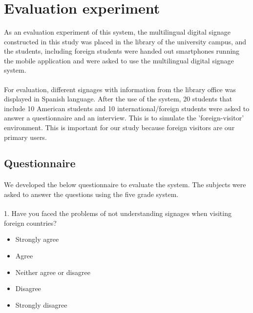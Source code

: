 \documentclass[12pt]{article}
\begin{document}
\section{Evaluation experiment}
\label{evaluation}

\paragraph{}As an evaluation experiment of this system, the multilingual digital signage constructed in this study was placed in the library of the university campus, and the students, including foreign students were handed out smartphones running the mobile application and were asked to use the multilingual digital signage system.

\paragraph{}For evaluation, different signages with information from the library office was displayed in Spanish language. After the use of the system, 20 students that include 10 American students and 10 international/foreign students were asked to answer a questionnaire and an interview. This is to simulate the 'foreign-visitor' environment. This is important for our study because foreign visitors are our primary users.

\subsection{Questionnaire}

\paragraph{}We developed the below questionnaire to evaluate the system. The subjects were asked to answer the questions using the five grade system. 

\paragraph{}1. Have you faced the problems of not understanding signages when visiting foreign countries?
\begin{itemize}
	\item Strongly agree
	\item Agree
	\item Neither agree or disagree
	\item Disagree
	\item Strongly disagree
\end{itemize}
\end{document}
